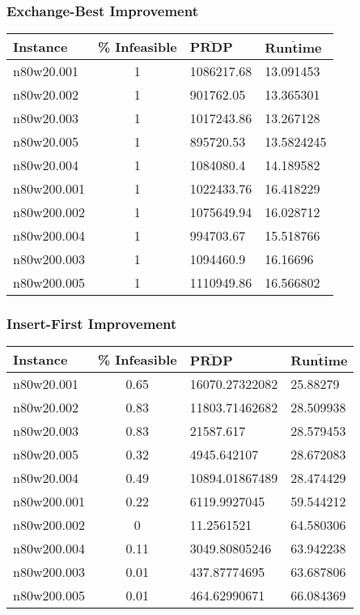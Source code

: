 \begin{homeworkProblem}
\subsubsection{Exchange-Best Improvement}
\begin{center}
\begin{tabular}{|l|c|l|l|}
\hline
\textbf{Instance}& \textbf{\% Infeasible} & $\mathbf{\bar{PRDP}}$ &$\mathbf{\bar{Runtime}}$\\
\hline
n80w20.001&1&1086217.68&13.091453\\
\hline
n80w20.002&1&901762.05&13.365301\\
\hline
n80w20.003&1&1017243.86&13.267128\\
\hline
n80w20.005&1&895720.53&13.5824245\\
\hline
n80w20.004&1&1084080.4&14.189582\\
\hline
n80w200.001&1&1022433.76&16.418229\\
\hline
n80w200.002&1&1075649.94&16.028712\\
\hline
n80w200.004&1&994703.67&15.518766\\
\hline
n80w200.003&1&1094460.9&16.16696\\
\hline
n80w200.005&1&1110949.86&16.566802\\
\hline
\end{tabular}
\label{tab:e.b}
\end{center}

\subsubsection{Insert-First Improvement}
\begin{center}
\begin{tabular}{|l|c|l|l|}
\hline
\textbf{Instance}& \textbf{\% Infeasible} & $\mathbf{\bar{PRDP}}$ &$\mathbf{\bar{Runtime}}$\\
\hline
n80w20.001&0.65&16070.27322082&25.88279\\
\hline
n80w20.002&0.83&11803.71462682&28.509938\\
\hline
n80w20.003&0.83&21587.617&28.579453\\
\hline
n80w20.005&0.32&4945.642107&28.672083\\
\hline
n80w20.004&0.49&10894.01867489&28.474429\\
\hline
n80w200.001&0.22&6119.9927045&59.544212\\
\hline
n80w200.002&0&11.2561521&64.580306\\
\hline
n80w200.004&0.11&3049.80805246&63.942238\\
\hline
n80w200.003&0.01&437.87774695&63.687806\\
\hline
n80w200.005&0.01&464.62990671&66.084369\\
\hline
\end{tabular}
\label{tab:i.f}
\end{center}


\end{homeworkProblem}
